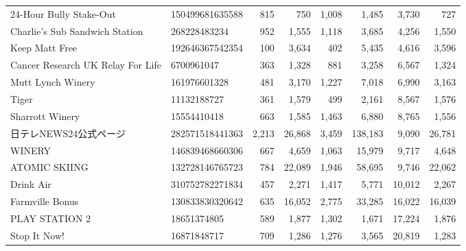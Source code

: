 \begin{longtable}{llrrrrrr}
                           24-Hour Bully Stake-Out &  150499681635588 &     815 &         750 &      1,008 &       1,485 &       3,730 &       727 \\
                    Charlie's Sub Sandwich Station &     268228483234 &     952 &       1,555 &      1,118 &       3,685 &       4,256 &     1,550 \\
                                    Keep Matt Free &  192646367542354 &     100 &       3,634 &        402 &       5,435 &       4,616 &     3,596 \\
                 Cancer Research UK Relay For Life &       6700961047 &     363 &       1,328 &        881 &       3,258 &       6,567 &     1,324 \\
                                 Mutt Lynch Winery &     161976601328 &     481 &       3,170 &      1,227 &       7,018 &       6,990 &     3,163 \\
                                             Tiger &      11132188727 &     361 &       1,579 &        499 &       2,161 &       8,567 &     1,576 \\
                                   Sharrott Winery &      15554410418 &     663 &       1,585 &      1,463 &       6,880 &       8,765 &     1,556 \\
                                    日テレNEWS24公式ページ &  282571518441363 &   2,213 &      26,868 &      3,459 &     138,183 &       9,090 &    26,781 \\
                                            WINERY &  146839468660306 &     667 &       4,659 &      1,063 &      15,979 &       9,717 &     4,648 \\
                                     ATOMIC SKIING &  132728146765723 &     784 &      22,089 &      1,946 &      58,695 &       9,746 &    22,062 \\
                                         Drink Air &  310752782271834 &     457 &       2,271 &      1,417 &       5,771 &      10,012 &     2,267 \\
                                   Farmville Bonus &  130833830320642 &     635 &      16,052 &      2,775 &      33,285 &      16,022 &    16,039 \\
                                    PLAY STATION 2 &      18651374805 &     589 &       1,877 &      1,302 &       1,671 &      17,224 &     1,876 \\
                                      Stop It Now! &      16871848717 &     709 &       1,286 &      1,276 &       3,565 &      20,819 &     1,283 \\

\end{longtable}
